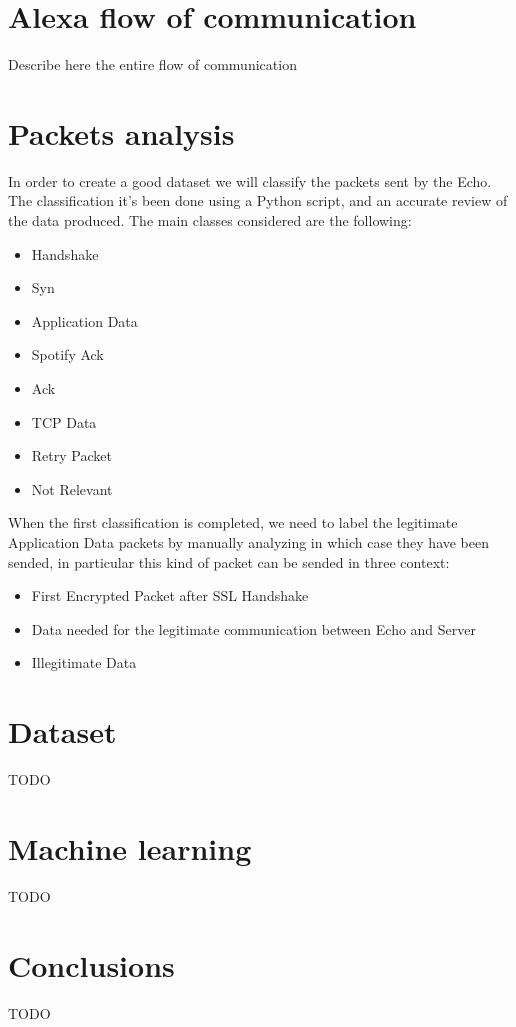 \documentclass[sigconf]{acmart}
\begin{document}
\section{Alexa flow of communication}
Describe here the entire flow of communication

\section{Packets analysis}
In order to create a good dataset we will classify the packets sent by the Echo.
The classification it's been done using a Python script, and an accurate review of the data produced.
The main classes considered are the following:
\begin{itemize}
  \item Handshake
  \item Syn
  \item Application Data
  \item Spotify Ack
  \item Ack
  \item TCP Data
  \item Retry Packet
  \item Not Relevant
\end{itemize}
When the first classification is completed, we need to label the legitimate Application Data packets by manually analyzing in which case they have been sended, in particular this kind of packet can be sended in three context:
\begin{itemize}
  \item First Encrypted Packet after SSL Handshake
  \item Data needed for the legitimate communication between Echo and Server
  \item Illegitimate Data
\end{itemize}

\section{Dataset}
TODO

\section{Machine learning}
TODO

\section{Conclusions}
TODO



\end{document}
